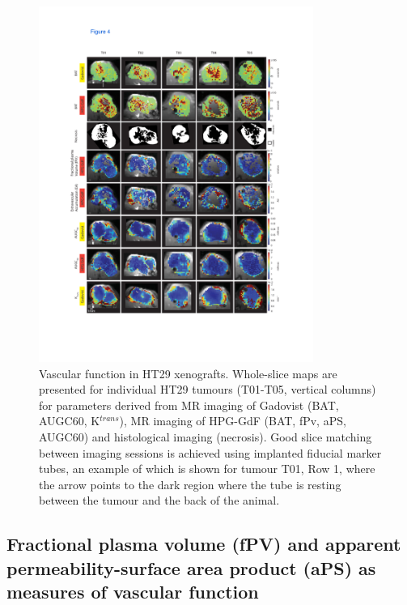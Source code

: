 \begin{figure}[htbp]
 \begin{center}
 \includegraphics[width=0.8\textwidth]{hpg/hpg-paper1-images/hpg_fig4-ht29.pdf}
 \caption{Vascular function in HT29 xenografts. Whole-slice maps are presented for individual HT29 tumours (T01-T05, vertical columns) for parameters derived from MR imaging of Gadovist (BAT, AUGC60, K$^{trans}$), MR imaging of \ac{HPG-GdF} (BAT, fPv, \ac{aPS}, AUGC60) and histological imaging (necrosis). Good slice matching between imaging sessions is achieved using implanted fiducial marker tubes, an example of which is shown for tumour T01, Row 1, where the arrow points to the dark region where the tube is resting between the tumour and the back of the animal.}
 \label{hpgpaper1:fig4}
 \end{center}
\end{figure}

\subsection{Fractional plasma volume (fPV) and apparent permeability-surface area product (aPS) as measures of vascular function}

